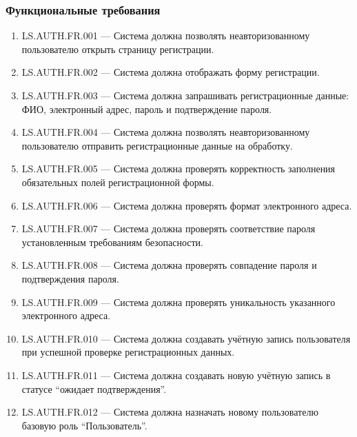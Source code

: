 \documentclass[12pt,a4paper]{article}
\begin{document}
	\subsubsection{Функциональные требования}
	
	\begin{enumerate}
		\item LS.AUTH.FR.001 --- Система должна позволять неавторизованному
		пользователю открыть страницу регистрации.
		
		\item LS.AUTH.FR.002 --- Система должна отображать форму регистрации.
		
		\item LS.AUTH.FR.003 --- Система должна запрашивать регистрационные данные:
		ФИО, электронный адрес, пароль и подтверждение пароля.
		
		\item LS.AUTH.FR.004 --- Система должна позволять неавторизованному
		пользователю отправить регистрационные данные на обработку.
		
		\item LS.AUTH.FR.005 --- Система должна проверять корректность заполнения
		обязательных полей регистрационной формы.
		
		\item LS.AUTH.FR.006 --- Система должна проверять формат электронного адреса.
		
		\item LS.AUTH.FR.007 --- Система должна проверять соответствие пароля
		установленным требованиям безопасности.
		
		\item LS.AUTH.FR.008 --- Система должна проверять совпадение пароля и
		подтверждения пароля.
		
		\item LS.AUTH.FR.009 --- Система должна проверять уникальность указанного
		электронного адреса.
		
		\item LS.AUTH.FR.010 --- Система должна создавать учётную запись пользователя
		при успешной проверке регистрационных данных.
		
		\item LS.AUTH.FR.011 --- Система должна создавать новую учётную запись в
		статусе ``ожидает подтверждения''.
		
		\item LS.AUTH.FR.012 --- Система должна назначать новому пользователю базовую
		роль ``Пользователь''.
		

\end{enumerate}
\end{document}

